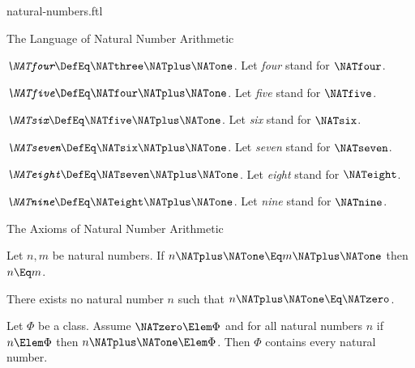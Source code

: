 \documentclass{stex}
\begin{document}
\begin{smodule}{natural-numbers.ftl}
\begin{sfragment}{The Language of Natural Number Arithmetic}
  \begin{definition}[forthel,for=four]
    $\emph{\NATfour} \DefEq \NATthree \NATplus \NATone$.
    Let \emph{four} stand for $\NATfour$.
  \end{definition}

  \begin{definition}[forthel,for=five]
    $\emph{\NATfive} \DefEq \NATfour \NATplus \NATone$.
    Let \emph{five} stand for $\NATfive$.
  \end{definition}

  \begin{definition}[forthel,for=six]
    $\emph{\NATsix} \DefEq \NATfive \NATplus \NATone$.
    Let \emph{six} stand for $\NATsix$.
  \end{definition}

  \begin{definition}[forthel,for=seven]
    $\emph{\NATseven} \DefEq \NATsix \NATplus \NATone$.
    Let \emph{seven} stand for $\NATseven$.
  \end{definition}

  \begin{definition}[forthel,for=eight]
    $\emph{\NATeight} \DefEq \NATseven \NATplus \NATone$.
    Let \emph{eight} stand for $\NATeight$.
  \end{definition}

  \begin{definition}[forthel,for=nine]
    $\emph{\NATnine} \DefEq \NATeight \NATplus \NATone$.
    Let \emph{nine} stand for $\NATnine$.
  \end{definition}
\end{sfragment}

\begin{sfragment}{The Axioms of Natural Number Arithmetic}


  \begin{axiom}[forthel,name=injectivity of successor function]
    Let $n, m$ be natural numbers.
    If $n \NATplus \NATone \Eq m \NATplus \NATone$ then $n \Eq m$.
  \end{axiom}

  \begin{axiom}[forthel]
    There exists no natural number $n$ such that $n \NATplus \NATone \Eq \NATzero$.
  \end{axiom}


  \begin{axiom}[forthel,title=Induction,name=induction I]
    Let $\Phi$ be a class.
    Assume $\NATzero \Elem \Phi$ and for all natural numbers $n$ if $n \Elem \Phi$ then
    $n \NATplus \NATone \Elem \Phi$.
    Then $\Phi$ contains every natural number.
  \end{axiom}


\end{sfragment}
\end{smodule}
\end{document}
